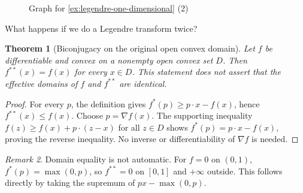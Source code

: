 \documentclass[11pt]{article}
\numberwithin{equation}{section}
\newtheorem{theorem}{Theorem}[section]
\theoremstyle{definition}
\theoremstyle{remark}
\newtheorem{remark}[theorem]{Remark}
\newcommand{\pqty}[1]{\left(#1\right)}
\newcommand{\legendre}[1]{{#1}^{*}}
\begin{document}
\begin{figure}[ht!]
    \centering


    \caption{Graph for \autoref{ex:legendre-one-dimensional} (2)}
    \label{fig:graph-legendre-one-dimensional-2}
\end{figure}

What happens if we do a Legendre transform twice?

\begin{theorem}[Biconjugacy on the original open convex domain]\label{variation-unit-0023}
\label{thm:legendre-transform-of-legendre-transform}
Let \(f\) be differentiable and convex on a nonempty open convex set \(D\).
Then \(f^{**}(x)=f(x)\) for every \(x\in D\). This statement does not assert
that the effective domains of \(f\) and \(f^{**}\) are identical.
\end{theorem}
\begin{proof}
For every \(p\), the definition gives \(f^*(p)\ge p\cdot x-f(x)\), hence
\(f^{**}(x)\le f(x)\). Choose \(p=\nabla f(x)\). The supporting inequality
\(f(z)\ge f(x)+p\cdot(z-x)\) for all \(z\in D\) shows
\(f^*(p)=p\cdot x-f(x)\), proving the reverse inequality.
No inverse or differentiability of \(\nabla f\) is needed.
\end{proof}
\begin{remark}\label{variation-unit-0024}
Domain equality is not automatic. For \(f=0\) on \((0,1)\),
\(f^*(p)=\max(0,p)\), so \(f^{**}=0\) on \([0,1]\) and \(+\infty\) outside.
This follows directly by taking the supremum of \(px-\max(0,p)\).
\end{remark}
\end{document}

